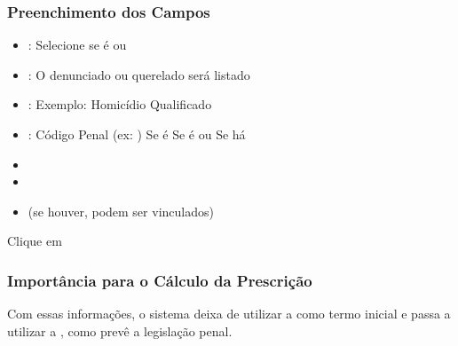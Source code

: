 \documentclass[letterpaper,10pt,brazil]{sphinxmanual}
\begin{document}
\subsubsection{Preenchimento dos Campos}
\label{\detokenize{projud_53_cadastrodenuncia:preenchimento-dos-campos}}\begin{itemize}
\item {} 
\sphinxAtStartPar
{}: Selecione se é  ou 

\item {} 
\sphinxAtStartPar
{}: O denunciado ou querelado será listado

\item {} 
\sphinxAtStartPar
{}: Exemplo: Homicídio Qualificado

\item {} 
\sphinxAtStartPar
{}:
\sphinxhyphen{} Código Penal (ex: )
\sphinxhyphen{} Se é 
\sphinxhyphen{} Se é  ou 
\sphinxhyphen{} Se há 

\item {} 
\sphinxAtStartPar
{}

\item {} 
\sphinxAtStartPar
{}

\item {} 
\sphinxAtStartPar
{} (se houver, podem ser vinculados)

\end{itemize}

\sphinxAtStartPar
Clique em 


\subsubsection{Importância para o Cálculo da Prescrição}
\label{\detokenize{projud_53_cadastrodenuncia:importancia-para-o-calculo-da-prescricao}}
\sphinxAtStartPar
Com essas informações, o sistema deixa de utilizar a  como termo inicial e passa a utilizar a , como prevê a legislação penal.
\end{document}
